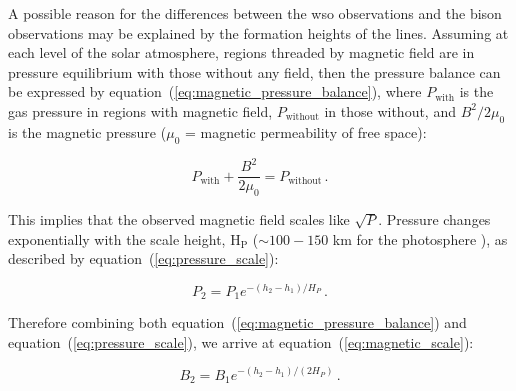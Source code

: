 A possible reason for the differences between the \gls{wso} observations and the \gls{bison} observations may be explained by the formation heights of the lines. Assuming at each level of the solar atmosphere, regions threaded by magnetic field are in pressure equilibrium with those without any field, then the pressure balance can be expressed by equation~(\ref{eq:magnetic_pressure_balance}), where $P_\mathrm{with}$ is the gas pressure in regions with magnetic field, $P_\mathrm{without}$ in those without, and $B^2/2\mu_0$ is the magnetic pressure ($\mu_0$ = magnetic permeability of free space):

\begin{equation}
P_\mathrm{with} + \frac{B^2}{2\mu_0} = P_\mathrm{without} \, .
\label{eq:magnetic_pressure_balance}
\end{equation}

This implies that the observed magnetic field scales like $\sqrt{P}$. Pressure changes exponentially with the scale height, H$_\mathrm{P}$ ($\sim 100-150$ km for the photosphere \citep{christensen-dalsgaard_current_1996}), as described by equation~(\ref{eq:pressure_scale}): 

\begin{equation}
P_2 = P_1 e^{ - (h_2-h_1)/H_P} \, .
\label{eq:pressure_scale}
\end{equation}

Therefore combining both equation~(\ref{eq:magnetic_pressure_balance}) and equation~(\ref{eq:pressure_scale}), we arrive at equation~(\ref{eq:magnetic_scale}):

\begin{equation}
B_2 = B_1 e^{ - (h_2-h_1)/(2H_P)} \, .
\label{eq:magnetic_scale}
\end{equation} 


